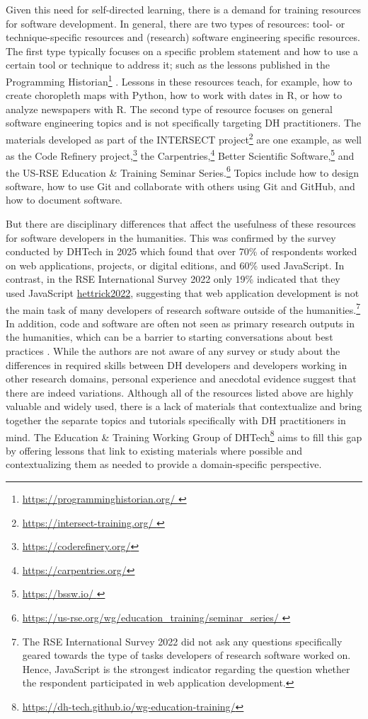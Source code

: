 \documentclass[final]{anthology-ch} %
\begin{document}
Given this need for self-directed learning, there is a demand for training resources for software development. In general, there are two types of resources: tool- or technique-specific resources and (research) software engineering specific resources. The first type typically focuses on a specific problem statement and how to use a certain tool or technique to address it; such as the  lessons published in the Programming Historian\footnote{\url{https://programminghistorian.org/
}} \cite{mullen2025, ryan2021}. Lessons in these resources teach, for example, how to create choropleth maps with Python, how to work with dates in R, or how to analyze newspapers with R. The second type of resource focuses on general software engineering topics and is not specifically targeting DH practitioners. The materials developed as part of the INTERSECT project\footnote{\url{https://intersect-training.org/
}} are one example, as well as the Code Refinery project,\footnote{\url{https://coderefinery.org/}} the Carpentries,\footnote{\url{https://carpentries.org/}} Better Scientific Software,\footnote{\url{https://bssw.io/
}} and the US-RSE Education \& Training Seminar Series.\footnote{\url{https://us-rse.org/wg/education\_training/seminar\_series/
}} Topics include how to design software, how to use Git and collaborate with others using Git and GitHub, and how to document software.

But there are disciplinary differences that affect the usefulness of these resources for software developers in the humanities. This was confirmed by the survey conducted by DHTech in 2025 which found that over 70\% of respondents worked on web applications, projects, or digital editions, and 60\% used JavaScript. In contrast, in the RSE International Survey 2022 only 19\% indicated that they used JavaScript \url{hettrick2022}, suggesting that web application development is not the main task of many developers of research software outside of the humanities.\footnote{The RSE International Survey 2022 did not ask any questions specifically geared towards the type of tasks developers of research software worked on. Hence, JavaScript is the strongest indicator regarding the question whether the respondent participated in web application development.
} In addition, code and software are often not seen as primary research outputs in the humanities, which can be a barrier to starting conversations about best practices \cite{vanzundert2020}. While the authors are not aware of any survey or study about the differences in required skills between DH developers and developers working in other research domains, personal experience and anecdotal evidence suggest that there are indeed variations. Although all of the resources listed above are highly valuable and widely used, there is a lack of materials that contextualize and bring together the separate topics and tutorials specifically with DH practitioners in mind. The Education \& Training Working Group of DHTech\footnote{\url{https://dh-tech.github.io/wg-education-training/}} aims to fill this gap by offering lessons that link to existing materials where possible and contextualizing them as needed to provide a domain-specific perspective.
\end{document}
